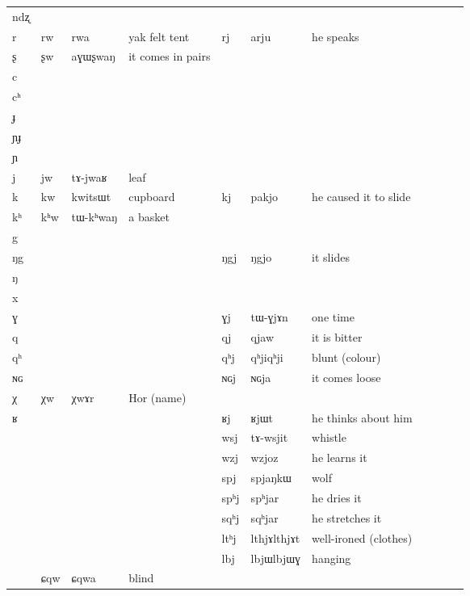 \documentclass[oldfontcommands,oneside,a4paper,11pt]{article}
\newcommand{\ipa}[1]{{\phon #1}} %
\newcommand{\tib}[1]{\cellcolor{lightgray}\textbf{#1}}
\newcommand{\idph}[1]{\cellcolor{gray}\textbf{#1}}
\begin{document}
\begin{table}
{\begin{tabular}{l|lll|lll|lll|l}
\ipa{ndʐ} &	 &	 &	&	 &	 &	\\
\ipa{r} &	\ipa{rw}\tib{} &	\ipa{rwa} &	yak felt tent&	\ipa{rj} &	\ipa{arju} &he speaks	\\
\ipa{ʂ} &	\ipa{ʂw} \tib{}&	\ipa{aɣɯʂwaŋ} &	it comes in pairs&	 &	 &	\\
\ipa{c} &	 &	 &	&	 &	 &	\\
\ipa{cʰ} &	 &	 &	&	 &	 &	\\
\ipa{ɟ} &	 &	 &	&	 &	 &	\\
\ipa{ɲɟ} &	 &	 &	&	 &	 &	\\
\ipa{ɲ} &	 &	 &	&	 &	 &	\\
\ipa{j} &	\ipa{jw} &	\ipa{tɤ-jwaʁ} &leaf	&	 &	 &	\\
\ipa{k} &	\ipa{kw}\tib{} &	\ipa{kwitsɯt} &	cupboard&	\ipa{kj} &	\ipa{pakjo} &he caused it to slide	\\
\ipa{kʰ} &	\ipa{kʰw}\tib{} &	\ipa{tɯ-kʰwaŋ} &a basket	&	 &	 &	\\
\ipa{g} &	 &	 &	&	 &	 &	\\
\ipa{ŋg} &	 &	 &	&	\ipa{ŋgj} &	\ipa{ŋgjo} &it  slides	\\
\ipa{ŋ} &	 &	 &	&	 &	 &	\\
\ipa{x} &	 &	 &	&	 &	 &	\\
\ipa{ɣ} &	 &	 &	&	\ipa{ɣj} &	\ipa{tɯ-ɣjɤn} &	one time\\
\ipa{q} &	 &	 &	&	\ipa{qj} &	\ipa{qjaw} &it is bitter	\\
\ipa{qʰ} &	 &	 &	&	\ipa{qʰj} \idph{}&	\ipa{qʰjiqʰji} &blunt (colour)	\\
\ipa{ɴɢ} &	 &	 &	&	\ipa{ɴɢj} &	\ipa{ɴɢja} &it comes loose	\\
\ipa{χ} &	\ipa{χw}\tib{} &	\ipa{χwɤr} &Hor (name)	&	 &	 &	\\
\ipa{ʁ} &	 &	 &	&	\ipa{ʁj} &	\ipa{ʁjɯt} &he 	thinks about him\\
\midrule
 &	 &	&&\ipa{wsj} &	\ipa{tɤ-wsjit} &whistle	\\
 &	 &	&&	\ipa{wzj}  \tib{}&	\ipa{wzjoz}  &he learns it	\\
\midrule
 &	 &	&&\ipa{spj} &	\ipa{spjaŋkɯ} &wolf	\\
 &	 &	&&\ipa{spʰj} &	\ipa{spʰjar} & he dries it	\\
 &	 &	&&\ipa{sqʰj} &	\ipa{sqʰjar} & he stretches it	\\
\midrule
 &	 &	&&\ipa{ltʰj}  \idph{}&	\ipa{lthjɤlthjɤt} &	well-ironed (clothes)\\
 &	 &	&&\ipa{lbj} \idph{}&	\ipa{lbjɯlbjɯɣ} &	hanging\\
\midrule
&\ipa{ɕqw}&\ipa{ɕqwa} &blind\\

\end{tabular}}
\end{table}
\end{document}

